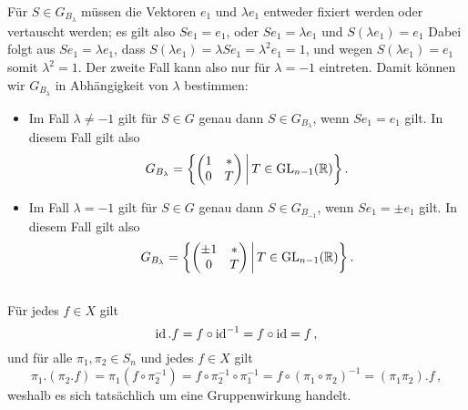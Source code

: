 \begin{itemize}
    Für $S \in G_{B_\lambda}$ müssen die Vektoren $e_1$ und $\lambda e_1$ entweder fixiert werden oder vertauscht werden; es gilt also $S e_1 = e_1$, oder $S e_1 = \lambda e_1$ und $S(\lambda e_1) = e_1$
    Dabei folgt aus $S e_1 = \lambda e_1$, dass $S(\lambda e_1) = \lambda S e_1 = \lambda^2 e_1 = 1$, und wegen $S(\lambda e_1) = e_1$ somit $\lambda^2 = 1$.
    Der zweite Fall kann also nur für $\lambda = -1$ eintreten.
    Damit können wir $G_{B_\lambda}$ in Abhängigkeit von $\lambda$ bestimmen:
    \begin{itemize}
      \item
        Im Fall $\lambda \neq -1$ gilt für $S \in G$ genau dann $S \in G_{B_\lambda}$, wenn $Se_1 = e_1$ gilt.
        In diesem Fall gilt also
        \[
            G_{B_\lambda}
          = \left\{
              \begin{pmatrix}
                1 & * \\
                0 & T
              \end{pmatrix}
            \suchthat*
              T \in \GL{n-1}{\Real}
            \right\}.
        \]
      \item
        Im Fall $\lambda = -1$ gilt für $S \in G$ genau dann $S \in G_{B_{-1}}$, wenn $S e_1 = \pm e_1$ gilt.
        In diesem Fall gilt also
        \[
            G_{B_\lambda}
          = \left\{
              \begin{pmatrix}
                \pm 1 & * \\
                    0 & T
              \end{pmatrix}
            \suchthat*
              T \in \GL{n-1}{\Real}
            \right\}.
        \]
    \end{itemize}
\end{itemize}





\addtocounter{subsection}{1}





\addtocounter{subsection}{1}





\subsection{}

Für jedes $f \in X$ gilt
\[
    \operatorname{id}.f
  = f \circ \operatorname{id}^{-1}
  = f \circ \operatorname{id}
  = f\,,
\]
und für alle $\pi_1, \pi_2 \in S_n$ und jedes $f \in X$ gilt
\[
    \pi_1.(\pi_2.f)
  = \pi_1(f \circ \pi_2^{-1})
  = f \circ \pi_2^{-1} \circ \pi_1^{-1}
  = f \circ (\pi_1 \circ \pi_2)^{-1}
  = (\pi_1 \pi_2).f\,,
\]
weshalb es sich tatsächlich um eine Gruppenwirkung handelt.

